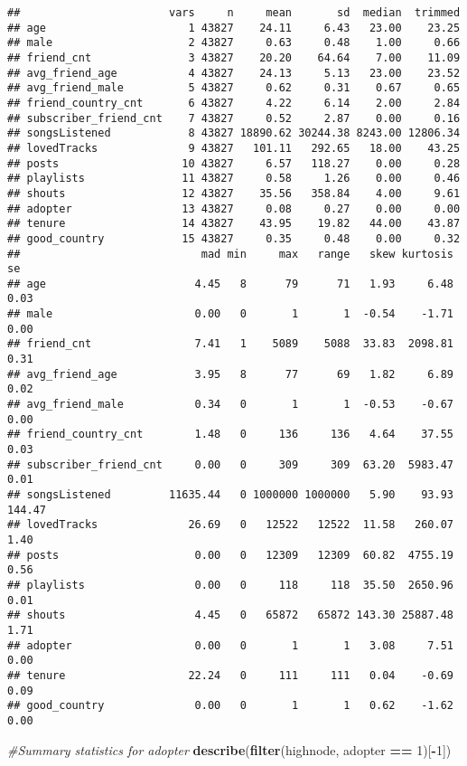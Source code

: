 \documentclass[]{article}
\newenvironment{Shaded}{\begin{snugshade}}{\end{snugshade}}
\newcommand{\KeywordTok}[1]{\textcolor[rgb]{0.13,0.29,0.53}{\textbf{#1}}}
\newcommand{\DecValTok}[1]{\textcolor[rgb]{0.00,0.00,0.81}{#1}}
\newcommand{\StringTok}[1]{\textcolor[rgb]{0.31,0.60,0.02}{#1}}
\newcommand{\CommentTok}[1]{\textcolor[rgb]{0.56,0.35,0.01}{\textit{#1}}}
\newcommand{\OperatorTok}[1]{\textcolor[rgb]{0.81,0.36,0.00}{\textbf{#1}}}
\newcommand{\NormalTok}[1]{#1}
\begin{document}
\begin{verbatim}
##                       vars     n     mean       sd  median  trimmed
## age                      1 43827    24.11     6.43   23.00    23.25
## male                     2 43827     0.63     0.48    1.00     0.66
## friend_cnt               3 43827    20.20    64.64    7.00    11.09
## avg_friend_age           4 43827    24.13     5.13   23.00    23.52
## avg_friend_male          5 43827     0.62     0.31    0.67     0.65
## friend_country_cnt       6 43827     4.22     6.14    2.00     2.84
## subscriber_friend_cnt    7 43827     0.52     2.87    0.00     0.16
## songsListened            8 43827 18890.62 30244.38 8243.00 12806.34
## lovedTracks              9 43827   101.11   292.65   18.00    43.25
## posts                   10 43827     6.57   118.27    0.00     0.28
## playlists               11 43827     0.58     1.26    0.00     0.46
## shouts                  12 43827    35.56   358.84    4.00     9.61
## adopter                 13 43827     0.08     0.27    0.00     0.00
## tenure                  14 43827    43.95    19.82   44.00    43.87
## good_country            15 43827     0.35     0.48    0.00     0.32
##                            mad min     max   range   skew kurtosis     se
## age                       4.45   8      79      71   1.93     6.48   0.03
## male                      0.00   0       1       1  -0.54    -1.71   0.00
## friend_cnt                7.41   1    5089    5088  33.83  2098.81   0.31
## avg_friend_age            3.95   8      77      69   1.82     6.89   0.02
## avg_friend_male           0.34   0       1       1  -0.53    -0.67   0.00
## friend_country_cnt        1.48   0     136     136   4.64    37.55   0.03
## subscriber_friend_cnt     0.00   0     309     309  63.20  5983.47   0.01
## songsListened         11635.44   0 1000000 1000000   5.90    93.93 144.47
## lovedTracks              26.69   0   12522   12522  11.58   260.07   1.40
## posts                     0.00   0   12309   12309  60.82  4755.19   0.56
## playlists                 0.00   0     118     118  35.50  2650.96   0.01
## shouts                    4.45   0   65872   65872 143.30 25887.48   1.71
## adopter                   0.00   0       1       1   3.08     7.51   0.00
## tenure                   22.24   0     111     111   0.04    -0.69   0.09
## good_country              0.00   0       1       1   0.62    -1.62   0.00
\end{verbatim}

\begin{Shaded}
\begin{Highlighting}[]
\CommentTok{#Summary statistics for adopter}
\KeywordTok{describe}\NormalTok{(}\KeywordTok{filter}\NormalTok{(highnode, adopter }\OperatorTok{==}\StringTok{ }\DecValTok{1}\NormalTok{)[}\OperatorTok{-}\DecValTok{1}\NormalTok{])}
\end{Highlighting}
\end{Shaded}
\end{document}

